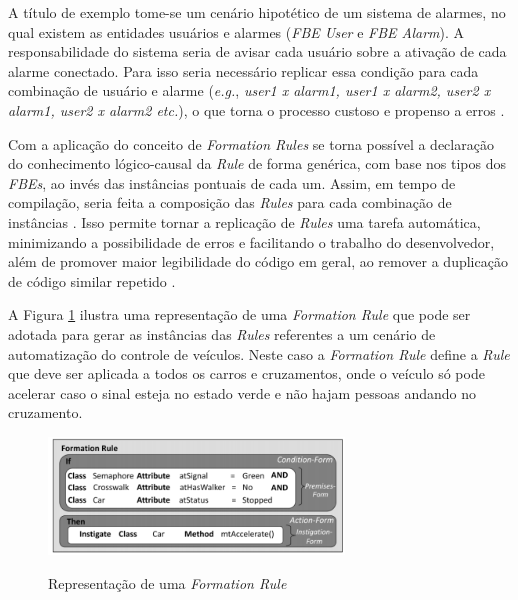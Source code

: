 A título de exemplo tome-se um cenário hipotético de um sistema de alarmes, no
qual existem as entidades usuários e alarmes (\textit{FBE User} e \textit{FBE
Alarm}). A responsabilidade do sistema seria de avisar cada usuário sobre a
ativação de cada alarme conectado. Para isso seria necessário replicar essa
condição para cada combinação de usuário e alarme (\textit{e.g.}, \textit{user1
x alarm1, user1 x alarm2, user2 x alarm1, user2 x alarm2 etc.}), o que torna o
processo custoso e propenso a erros \cite{doc_ronszcka_2019}.

Com a aplicação do conceito de \textit{Formation Rules} se torna possível a
declaração do conhecimento lógico-causal da \textit{Rule} de forma genérica, com
base nos tipos dos \textit{FBEs}, ao invés das instâncias pontuais de cada um.
Assim, em tempo de compilação, seria feita a composição das \textit{Rules} para
cada combinação de instâncias \cite{doc_ronszcka_2019}. Isso permite tornar a
replicação de \textit{Rules} uma tarefa automática, minimizando a possibilidade
de erros e facilitando o trabalho do desenvolvedor, além de promover maior
legibilidade do código em geral, ao remover a duplicação de código similar
repetido \cite{doc_ronszcka_2019}.

A Figura \ref{fig:formation_rule} ilustra uma representação de uma
\textit{Formation Rule} que pode ser adotada para gerar as instâncias das
\textit{Rules} referentes a um cenário de automatização do controle de veículos.
Neste caso a \textit{Formation Rule} define a \textit{Rule} que deve ser
aplicada a todos os carros e cruzamentos, onde o veículo só pode acelerar caso o
sinal esteja no estado verde e não hajam pessoas andando no cruzamento.

\begin{figure}[!htb]
  \centering
  \caption{Representação de uma \textit{Formation Rule}}
  \includegraphics[width=0.7\textwidth]{../figures/formation_rule.png}
  \smallskip
  \label{fig:formation_rule}
\end{figure}


